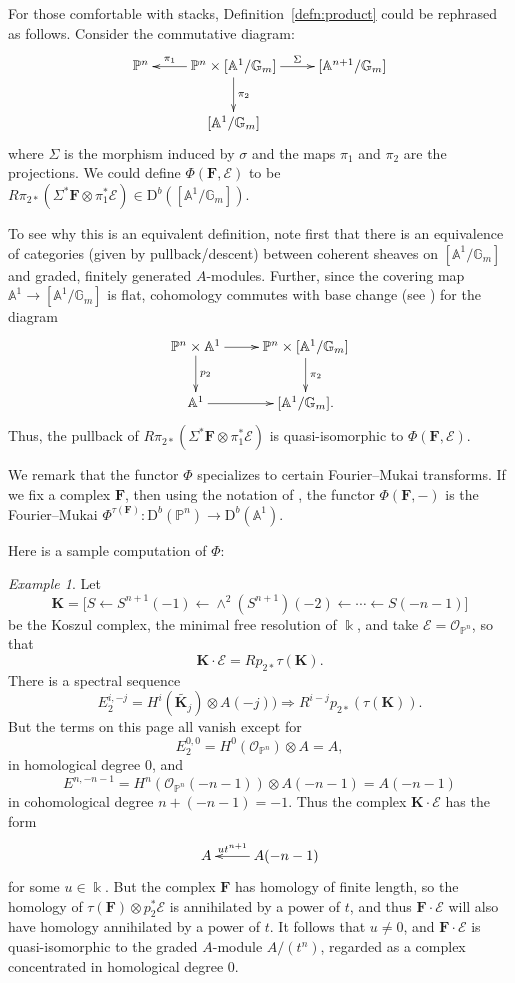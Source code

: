 \documentclass[12pt]{amsart}
\theoremstyle{definition}
\theoremstyle{remark}
\newtheorem{example}[lemma]{Example}
\newcommand{\Spec}{\operatorname{Spec}}
\newcommand{\kk}{\Bbbk}
\newcommand{\PP}{\mathbb{P}}
\renewcommand{\AA}{\mathbb{A}}
\newcommand{\GG}{\mathbb{G}}
\newcommand{\cO}{\mathcal{O}}
\newcommand{\cE}{\mathcal{E}}
\newcommand{\bK}{\mathbf{K}}
\newcommand{\FF}{\mathbf{F}}
\newcommand{\DD}{\mathrm{D}}
\begin{document}
For those comfortable with stacks, Definition~\ref{defn:product}
could be rephrased as follows. Consider the commutative diagram:
\[
\xymatrix{
\PP^n&\PP^{n}\times [\AA^1/\GG_m]\ar[l]_-{\pi_{1}} \ar[r]^-{\Sigma} \ar[d]^{\pi_2}&[\AA^{n+1}/\GG_m]\\
&[\AA^1/\GG_m]&%
}
\]
where $\Sigma$ is the morphism induced by $\sigma$ and the maps $\pi_1$ and $\pi_2$ are the projections.  We could define $\Phi(\FF,\cE)$ to be $R\pi_{2*}\left( \Sigma^*\FF\otimes \pi_{1}^{*}\cE\right)\in \DD^b([\AA^1/\GG_m])$.

To see why this is an equivalent definition, note first  that there is an equivalence of categories (given by pullback/descent) between coherent sheaves on $[\AA^1/\GG_m]$ and graded, finitely generated $A$-modules. Further, since the covering map $\AA^1\to [\AA^1/\GG_m]$ is flat, cohomology commutes with base change (see \cite[0765]{stacks-project}) for the diagram
\[
\xymatrix{
\PP^n\times \AA^1\ar[r]\ar[d]^-{p_2}&\PP^{n}\times [\AA^1/\GG_m]\ar[d]^{\pi_2}\\
\AA^1\ar[r]&[\AA^1/\GG_m].
}
\]
Thus, the pullback of $R\pi_{2*}\left( \Sigma^*\FF\otimes \pi_{1}^{*}\cE\right)$ is quasi-isomorphic 
to $\Phi(\FF,\cE)$.

We remark that the functor $\Phi$ specializes to certain Fourier--Mukai transforms. If we fix a complex $\FF$, then using the notation of \cite[Definition~3.3]{caldararu}, the functor $\Phi(\FF, -)$ is the Fourier--Mukai $\Phi^{\tau(\FF)}\colon \DD^b(\PP^n)\to \DD^b(\AA^1)$.

Here is a sample computation of $\Phi$: 

\begin{example} Let 
$$
\bK = \bigl[ S\gets S^{n+1}(-1) \gets \wedge^{2}(S^{n+1})(-2) \gets\cdots\gets S(-n-1)\bigr]
$$
be the Koszul complex, the minimal free resolution of $\kk$, and take
$\cE = \cO_{\PP^{n}}$, so that 
$$
\bK \cdot \cE = Rp_{2*}\tau(\bK).$$  
There is a spectral sequence
\[
E_2^{i,-j}=H^i(\widetilde{\bK_j})\otimes A(-j))\Rightarrow R^{i-j}p_{2*}(\tau(\bK)).
\]
But 
the terms on this page all vanish except for
$$
E^{0,0}_2= H^{0}(\cO_{\PP^{n}})\otimes A = A,
$$
in homological degree 0, and 
$$
E^{n,-n-1}=H^{n}(\cO_{\PP^{n}}(-n-1)) \otimes  A(-n-1) = A(-n-1)
$$
in cohomological degree $n+(-n-1) = -1$.
Thus the complex $\bK \cdot \cE$ has the form
$$
\xymatrix{
A&A(-n-1)\ar[l]_-{ut^{n+1}}
}
$$
for some $u\in \kk$. But the complex $\FF$ has homology of finite length, so the homology of $\tau(\FF) \otimes p_{2}^{*}\cE$ is annihilated by a power of $t$, and thus $\FF\cdot \cE$ will also have homology annihilated by a power of $t$. It follows that $u\neq 0$, and $\FF\cdot \cE$ is quasi-isomorphic to the graded $A$-module $A/(t^{n})$, regarded as a complex concentrated in homological degree 0.
\end{example}
\end{document}
